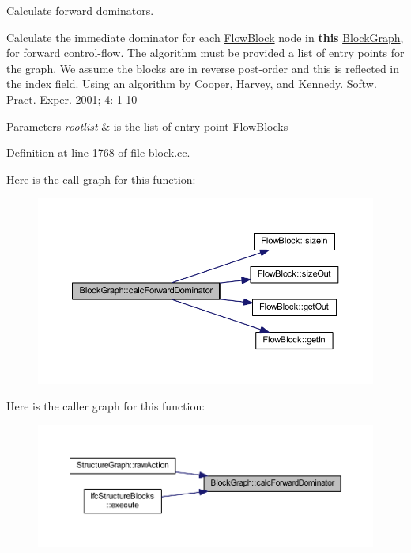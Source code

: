 Calculate forward dominators. 

Calculate the immediate dominator for each \mbox{\hyperlink{class_flow_block}{Flow\+Block}} node in {\bfseries{this}} \mbox{\hyperlink{class_block_graph}{Block\+Graph}}, for forward control-\/flow. The algorithm must be provided a list of entry points for the graph. We assume the blocks are in reverse post-\/order and this is reflected in the index field. Using an algorithm by Cooper, Harvey, and Kennedy. Softw. Pract. Exper. 2001; 4\+: 1-\/10 
\begin{DoxyParams}{Parameters}
{\em rootlist} & is the list of entry point Flow\+Blocks \\
\hline
\end{DoxyParams}


Definition at line 1768 of file block.\+cc.

Here is the call graph for this function\+:
\nopagebreak
\begin{figure}[H]
\begin{center}
\leavevmode
\includegraphics[width=350pt]{class_block_graph_a9026a993cc70a3e67c5eeb19d33a9d98_cgraph}
\end{center}
\end{figure}
Here is the caller graph for this function\+:
\nopagebreak
\begin{figure}[H]
\begin{center}
\leavevmode
\includegraphics[width=350pt]{class_block_graph_a9026a993cc70a3e67c5eeb19d33a9d98_icgraph}
\end{center}
\end{figure}
\mbox{\label{class_block_graph_aa65051f403ce79d384a76c4399cdad80}} 
